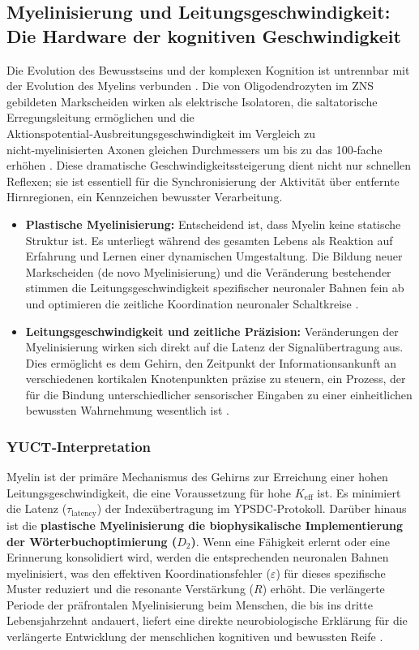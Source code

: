 \documentclass[12pt,a4paper]{article}
\begin{document}
	\subsection{Myelinisierung und Leitungsgeschwindigkeit: Die Hardware der kognitiven Geschwindigkeit}
	
	Die Evolution des Bewusstseins und der komplexen Kognition ist untrennbar mit der Evolution des Myelins verbunden \cite{Fields2008}. Die von Oligodendrozyten im ZNS gebildeten Markscheiden wirken als elektrische Isolatoren, die saltatorische Erregungsleitung ermöglichen und die Aktionspotential‑Ausbreitungsgeschwindigkeit im Vergleich zu nicht‑myelinisierten Axonen gleichen Durchmessers um bis zu das 100‑fache erhöhen \cite{Waxman1980}. Diese dramatische Geschwindigkeitssteigerung dient nicht nur schnellen Reflexen; sie ist essentiell für die Synchronisierung der Aktivität über entfernte Hirnregionen, ein Kennzeichen bewusster Verarbeitung.
	
	\begin{itemize}
		\item \textbf{Plastische Myelinisierung:} Entscheidend ist, dass Myelin keine statische Struktur ist. Es unterliegt während des gesamten Lebens als Reaktion auf Erfahrung und Lernen einer dynamischen Umgestaltung. Die Bildung neuer Markscheiden (de novo Myelinisierung) und die Veränderung bestehender stimmen die Leitungsgeschwindigkeit spezifischer neuronaler Bahnen fein ab und optimieren die zeitliche Koordination neuronaler Schaltkreise \cite{deFaria2021, Monje2023}.
		\item \textbf{Leitungsgeschwindigkeit und zeitliche Präzision:} Veränderungen der Myelinisierung wirken sich direkt auf die Latenz der Signalübertragung aus. Dies ermöglicht es dem Gehirn, den Zeitpunkt der Informationsankunft an verschiedenen kortikalen Knotenpunkten präzise zu steuern, ein Prozess, der für die Bindung unterschiedlicher sensorischer Eingaben zu einer einheitlichen bewussten Wahrnehmung wesentlich ist \cite{Pajevic2014}.
	\end{itemize}
	
	\subsubsection*{YUCT‑Interpretation}
	Myelin ist der primäre Mechanismus des Gehirns zur Erreichung einer hohen Leitungsgeschwindigkeit, die eine Voraussetzung für hohe \(K_{\mathrm{eff}}\) ist. Es minimiert die Latenz (\(\tau_{\text{latency}}\)) der Indexübertragung im YPSDC‑Protokoll. Darüber hinaus ist die \textbf{plastische Myelinisierung die biophysikalische Implementierung der Wörterbuchoptimierung (\(D_2\))}. Wenn eine Fähigkeit erlernt oder eine Erinnerung konsolidiert wird, werden die entsprechenden neuronalen Bahnen myelinisiert, was den effektiven Koordinationsfehler (\(\varepsilon\)) für dieses spezifische Muster reduziert und die resonante Verstärkung (\(R\)) erhöht. Die verlängerte Periode der präfrontalen Myelinisierung beim Menschen, die bis ins dritte Lebensjahrzehnt andauert, liefert eine direkte neurobiologische Erklärung für die verlängerte Entwicklung der menschlichen kognitiven und bewussten Reife \cite{Miller2012, Fields2015}.
	
\end{document}

